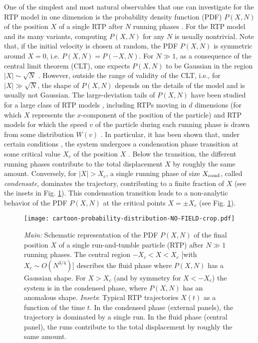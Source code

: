 \documentclass[aps,pre,twocolumn,superscriptaddress,showpacs]{revtex4-1}
\begin{document}
One of the simplest and most natural observables that one can investigate for the RTP model in one dimension is the probability density function (PDF) $P(X,N)$ of the position $X$ of a single RTP after $N$ running phases \cite{S87,MAD12,DM12,GM19,SBS20,PTV2020,MLDM21}. For the RTP model and its many variants, computing $P(X,N)$ for any $N$ is usually nontrivial. Note that, if the initial velocity is chosen at random, the PDF $P(X,N)$ is symmetric around $X=0$, i.e. $P(X,N)=P(-X,N)$. For $N\gg 1$, as a consequence of the central limit theorem (CLT), one expects $P(X,N)$ to be Gaussian in the region $|X|\sim \sqrt{N}$ \cite{C12}. However, outside the range of validity of the CLT, i.e., for $|X|\gg \sqrt{N}$, the shape of $P(X,N)$ depends on the details of the model and is usually not Gaussian. The large-deviation tails of $P(X,N)$ have been studied for a large class of RTP models \cite{ DM12,GM19,SBS20,PTV2020,MLDM21,M21}, including RTPs moving in $d$ dimensions (for which $X$ represents the $x$-component of the position of the particle) \cite{PTV2020,MLDM21} and RTP models for which the speed $v$ of the particle during each running phase is drawn from some distribution $W(v)$ \cite{ZSS08,GM19,MLDM21}. In particular, it has been shown that, under certain conditions \cite{MLDM21}, the system undergoes a condensation phase transition at some critical value $X_c$ of the position $X$ \cite{MLDM21}. Below the transition, the different running phases contribute to the total displacement $X$ by roughly the same amount. Conversely, for $|X|>X_c$, a single running phase of size $X_{\rm cond}$, called \emph{condensate}, dominates the trajectory, contributing to a finite fraction of $X$ (see the insets in Fig. \ref{fig1}). This condensation transition leads to a non-analytic behavior of the PDF $P(X,N)$ at the critical points $X=\pm X_c$ (see Fig. \ref{fig1}).


\begin{figure}
\texttt{[image: cartoon-probability-distribution-NO-FIELD-crop.pdf]}
\caption{\emph{Main:} Schematic representation of the PDF $P(X,N)$ of the final position $X$ of a single run-and-tumble particle (RTP) after $N\gg 1$ running phases. The central region $-X_c<X<X_c$ [with $X_c\sim O(N^{3/4})$] describes the fluid phase where $P(X,N)$ has a Gaussian shape. For $X>X_c$ (and by symmetry for $X<-X_c$) the system is in the condensed phase, where $P(X,N)$ has an anomalous shape. \emph{Insets}: Typical RTP trajectories $X(t)$ as a function of the time $t$. In the condensed phase (external panels), the trajectory is dominated by a single run. In the fluid phase (central panel), the runs contribute to the total displacement by roughly the same amount.}
\label{fig1}
\end{figure}
\end{document}
